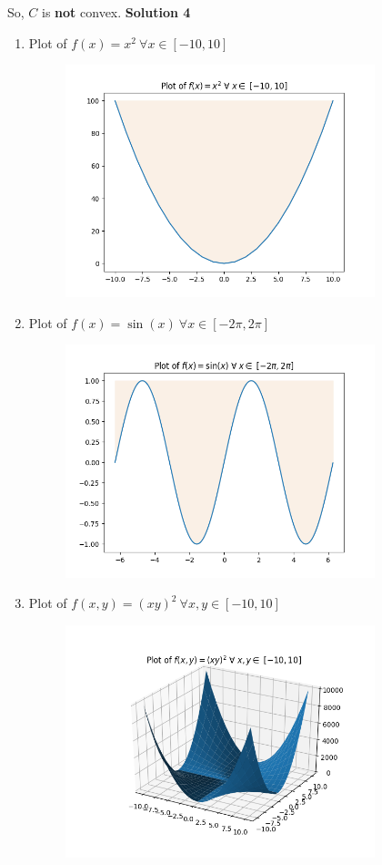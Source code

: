 \documentclass{article}
\begin{document}
\begin{flushleft}
So, $C$ is \textbf{not} convex.
\clearpage
\textbf{Solution 4}
\begin{enumerate}
	\item Plot of $f(x)=x^{2}\   \forall x \in[-10,10]$
	\begin{figure}[htp]
		\centering
		\includegraphics[width=9cm]{x2.png}
	\end{figure}
	\item Plot of $f(x)=\sin(x)\   \forall x \in[-2\pi,2\pi]$
	\begin{figure}[htp]
		\centering
		\includegraphics[width=9cm]{sinx.png}
	\end{figure}
	\clearpage
	\item Plot of $f(x,y)=(xy)^{2}\   \forall x,y \in[-10,10]$
	\begin{figure}[htp]
		\centering
		\includegraphics[width=9cm]{xy2.png}

\end{figure}
\end{enumerate}
\end{flushleft}
\end{document}
